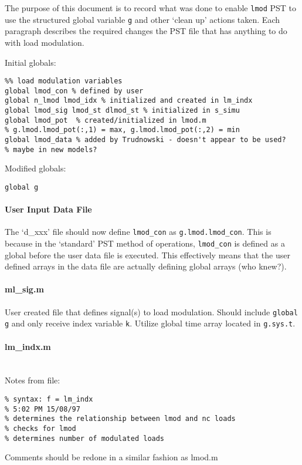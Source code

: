 \documentclass[12pt]{article}
\begin{document}
The purpose of this document is to record what was done to enable \verb|lmod| PST to use the structured global variable \verb|g| and other `clean up' actions taken.
Each paragraph describes the required changes the PST file that has anything to do with load modulation.

Initial globals:
\begin{verbatim}
%% load modulation variables
global lmod_con % defined by user
global n_lmod lmod_idx % initialized and created in lm_indx
global lmod_sig lmod_st dlmod_st % initialized in s_simu
global lmod_pot  % created/initialized in lmod.m 
% g.lmod.lmod_pot(:,1) = max, g.lmod.lmod_pot(:,2) = min
global lmod_data % added by Trudnowski - doesn't appear to be used?
% maybe in new models?
\end{verbatim}

Modified globals:
\begin{verbatim}
global g
\end{verbatim}

\paragraph{User Input Data File}
The `d\_xxx' file should now define \verb|lmod_con| as \verb|g.lmod.lmod_con|.
This is because in the `standard' PST method of operations, \verb|lmod_con| is defined as a global before the user data file is executed.
This effectively means that the user defined arrays in the data file are actually defining global arrays (who knew?).

\paragraph{ml\_sig.m}
User created file that defines signal(s) to load modulation.
Should include \verb|global g| and only receive index variable \verb|k|.
Utilize global time array located in \verb|g.sys.t|.

\paragraph{lm\_indx.m} %
\ \\
Notes from file:
\begin{verbatim}
% syntax: f = lm_indx
% 5:02 PM 15/08/97
% determines the relationship between lmod and nc loads
% checks for lmod
% determines number of modulated loads
\end{verbatim}
Comments should be redone in a similar fashion as lmod.m
\end{document}
